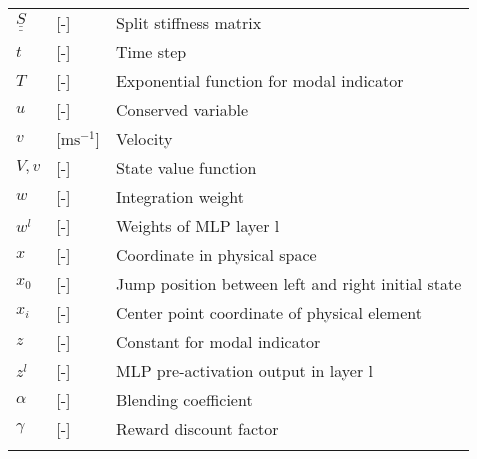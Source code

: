 \begin{tabular}{lll}
   \vspace{1mm}   
   $\underline{\underline{S}}$              & [-]             & Split stiffness matrix\\
    \vspace{1mm}   
   $t$              & [-]             & Time step\\ 
      \vspace{1mm}
      $T$              & [-]             & Exponential function for modal indicator\\  
   	\vspace{1mm}
  $u$              & [-]             & Conserved variable \\
    \vspace{1mm}
    $v$            & [m$\text{s}^{-1}$]            & Velocity \\
    \vspace{1mm}
   $V,v$              & [-]             & State value function\\    
   \vspace{1mm}
   $w$              & [-]             & Integration weight \\   
   \vspace{1mm}
     $w^l$              & [-]             & Weights of MLP layer l\\  
    \vspace{1mm}
   $x$              & [-]             & Coordinate in physical space \\
    \vspace{1mm}
   $x_{0}$              & [-]             & Jump position between left and right initial state \\
    \vspace{1mm} 
   $x_i$              & [-]             & Center point coordinate of physical element \\
   \vspace{1mm}  
   $z$              & [-]             & Constant for modal indicator\\  
   \vspace{1mm}
   $z^l$              & [-]             & MLP pre-activation output in layer l\\  
    \vspace{1mm}   
   $\alpha$              & [-]             & Blending coefficient\\   
   \vspace{1mm}
   $\gamma$              & [-]             & Reward discount factor\\       
   \vspace{1mm}

\end{tabular}
